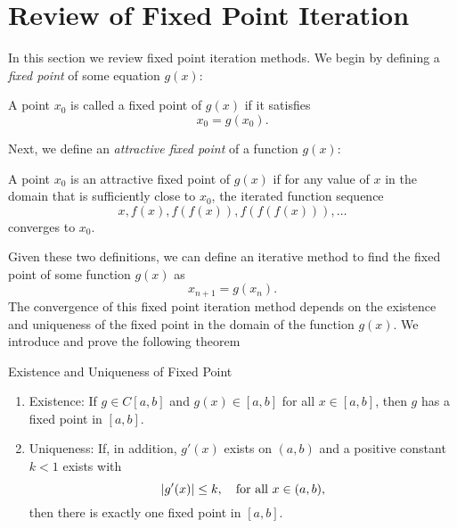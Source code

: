 \section{Review of Fixed Point Iteration}

In this section we review fixed point iteration methods. We begin by defining a \textit{fixed point} of some equation $g(x)$:
\begin{definition}
A point $x_{0}$ is called a fixed point of $g(x)$ if it satisfies
\begin{equation}
	x_{0} = g(x_{0}).
\end{equation}
\end{definition}
Next, we define an \textit{attractive fixed point} of a function $g(x)$:
\begin{definition}
A point $x_{0}$ is an attractive fixed point of $g(x)$ if for any value of $x$ in the domain that is sufficiently close to $x_{0}$, the iterated function sequence
\begin{equation}
	x, f(x), f(f(x)), f(f(f(x))), \dots
\end{equation}
converges to $x_{0}$.
\end{definition}
Given these two definitions, we can define an iterative method to find the fixed point of some function $g(x)$ as
\begin{equation}
x_{n+1} = g(x_{n}).
\end{equation}
The convergence of this fixed point iteration method depends on the existence and uniqueness of the fixed point in the domain of the function $g(x)$. We introduce and prove the following theorem
\begin{theorem}{Existence and Uniqueness of Fixed Point}
	\begin{enumerate}
		\item Existence: If $g \in C[a,b]$ and $g(x) \in [a,b]$ for all $x \in [a,b]$, then $g$ has a fixed point in $[a,b]$.
		\item Uniqueness: If, in addition, $g'(x)$ exists on $(a,b)$ and a positive constant $k < 1$ exists with
			\begin{equation*}
				\lvert g'(x)\rvert \leq k, \quad \text{for all } x \in (a,b),
			\end{equation*}
			then there is exactly one fixed point in $[a,b]$.
	\end{enumerate}
\end{theorem}

